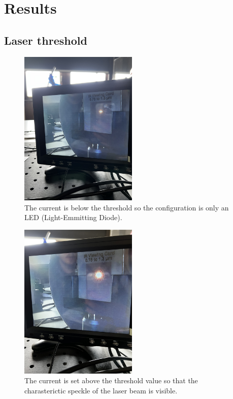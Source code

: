 \section{Results}
\label{sec:Auswertung}


\subsection{Laser threshold}

\begin{figure}
  \centering
  \includegraphics[width=0.5\textwidth]{content/LED.jpg}
  \caption{The current is below the threshold so the configuration is only an LED (Light-Emmitting Diode).}
  \label{fig:led}
\end{figure}

\begin{figure}
  \centering
  \includegraphics[width=0.5\textwidth]{content/laser.jpg}
  \caption{The current is set above the threshold value so that the charasterictic \grqq speckle\grqq{} of the laser beam is visible.}
  \label{fig:laser}
\end{figure}

